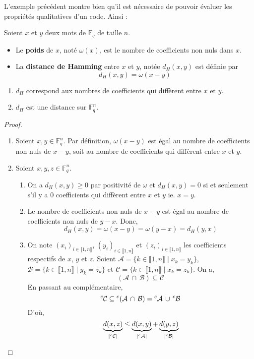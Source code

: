 	L'exemple précédent montre bien qu'il est nécessaire de pouvoir évaluer les propriétés qualitatives d'un code. Ainsi :
	
	\begin{definition}
		Soient $x$ et $y$ deux mots de $\mathbb{F}_q$ de taille $n$.
		\begin{itemize}
			\item Le \textbf{poids} de $x$, noté $\omega(x)$, est le nombre de coefficients non nuls dans $x$.
			\item La \textbf{distance de Hamming} entre $x$ et $y$, notée $d_H(x,y)$ est définie par
			\[ d_H(x,y) = \omega(x-y) \]
		\end{itemize}
	\end{definition}
	
	\begin{proposition}
		\begin{enumerate}[label=(\roman*)]
			\item $d_H$ correspond aux nombres de coefficients qui diffèrent entre $x$ et $y$.
			\item $d_H$ est une distance sur $\mathbb{F}_q^n$.
		\end{enumerate}
	\end{proposition}
	
	\begin{proof}
		\begin{enumerate}[label=(\roman*)]
			\item Soient $x, y \in \mathbb{F}_q^n$. Par définition, $\omega(x-y)$ est égal au nombre de coefficients non nuls de $x-y$, soit au nombre de coefficients qui diffèrent entre $x$ et $y$.
			\item Soient $x, y, z \in \mathbb{F}_q^n$.
			\begin{enumerate}
				\item On a $d_H(x,y) \geq 0$ par positivité de $\omega$ et $d_H(x,y) = 0$ si et seulement s'il y a $0$ coefficients qui diffèrent entre $x$ et $y$ ie. $x = y$.
				\item Le nombre de coefficients non nuls de $x-y$ est égal au nombre de coefficients non nuls de $y-x$. Donc,
				\[ d_H(x,y) = \omega(x-y) = \omega(y-x) = d_H(y,x) \]
				\item On note $(x_i)_{i \in \llbracket 1, n \rrbracket}$, $(y_i)_{i \in \llbracket 1, n \rrbracket}$ et $(z_i)_{i \in \llbracket 1, n \rrbracket}$ les coefficients respectifs de $x$, $y$ et $z$. Soient $\mathcal{A} = \{ k \in \llbracket 1, n \rrbracket \mid x_k = y_k \}$, $\mathcal{B} = \{ k \in \llbracket 1, n \rrbracket \mid y_k = z_k \}$ et $\mathcal{C} = \{ k \in \llbracket 1, n \rrbracket \mid x_k = z_k \}$. On a,
				\[ (\mathcal{A} \, \cap \, \mathcal{B}) \subseteq \mathcal{C} \]
				En passant au complémentaire,
				\[ \mathstrut ^c\mathcal{C} \subseteq \mathstrut ^c(\mathcal{A} \, \cap \, \mathcal{B}) = \mathstrut ^c \mathcal{A} \, \cup \, \mathstrut ^c \mathcal{B} \]
				D'où,
				\[ \underbrace{d(x,z)}_{|\mathstrut ^c\mathcal{C}|} \leq \underbrace{d(x,y)}_{|\mathstrut ^c\mathcal{A}|} + \underbrace{d(y,z)}_{|\mathstrut ^c\mathcal{B}|} \]
			\end{enumerate}
		\end{enumerate}
	\end{proof}
	

